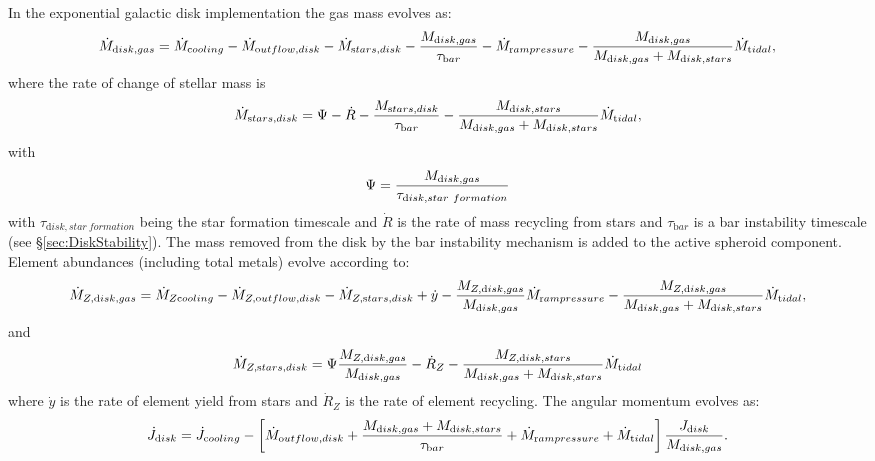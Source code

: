 In the exponential galactic disk implementation the gas mass evolves as:
\begin{equation}
 \dot{M}_{\mathrm disk, gas} = \dot{M}_{\mathrm cooling} - \dot{M}_{\mathrm outflow, disk} - \dot{M}_{\mathrm stars, disk} - {M_{\mathrm disk, gas}\over \tau_{\mathrm bar}} - \dot{M}_{\mathrm ram pressure} - {M_{\mathrm disk, gas} \over M_{\mathrm disk, gas} + M_{\mathrm disk, stars}} \dot{M}_{\mathrm tidal},
\end{equation}
where the rate of change of stellar mass is
\begin{equation}
 \dot{M}_{\mathrm stars, disk} = \Psi - \dot{R} - {M_{\mathrm stars,disk} \over \tau_{\mathrm bar}} - {M_{\mathrm disk, stars} \over M_{\mathrm disk, gas} + M_{\mathrm disk, stars}} \dot{M}_{\mathrm tidal},
\end{equation}
with
\begin{equation}
 \Psi = {M_{\mathrm disk, gas} \over \tau_{\mathrm disk, star~formation}}
\end{equation}
with $\tau_{\mathrm disk, star~formation}$ being the star formation timescale and $\dot{R}$ is the rate of mass recycling from stars and $\tau_{\mathrm bar}$ is a bar instability timescale (see \S\ref{sec:DiskStability}). The mass removed from the disk by the bar instability mechanism is added to the active spheroid component.
Element abundances (including total metals) evolve according to:
\begin{equation}
  \dot{M}_{Z, {\mathrm disk, gas}} = \dot{M}_{Z {\mathrm cooling}} - \dot{M}_{Z, {\mathrm outflow, disk}} - \dot{M}_{Z, {\mathrm stars, disk}} + \dot{y} - {M_{Z, {\mathrm disk, gas}} \over M_{\mathrm disk, gas}} \dot{M}_{\mathrm ram pressure} - {M_{Z, {\mathrm disk, gas}} \over M_{\mathrm disk, gas} + M_{\mathrm disk, stars}} \dot{M}_{\mathrm tidal},
\end{equation}
and
\begin{equation}
 \dot{M}_{Z, {\mathrm stars, disk}} = \Psi {M_{Z, {\mathrm disk, gas}} \over M_{\mathrm disk, gas}} - \dot{R}_Z - {M_{Z, {\mathrm disk, stars}} \over M_{\mathrm disk, gas} + M_{\mathrm disk, stars}} \dot{M}_{\mathrm tidal}
\end{equation}
where $\dot{y}$ is the rate of element yield from stars and $\dot{R}_Z$ is the rate of element recycling. The angular momentum evolves as:
\begin{equation}
 \dot{J}_{\mathrm disk} = \dot{J}_{\mathrm cooling} - \left[ \dot{M}_{\mathrm outflow, disk} + {M_{\mathrm disk, gas}  + M_{\mathrm disk, stars} \over \tau_{\mathrm bar}} + \dot{M}_{\mathrm ram pressure} + \dot{M}_{\mathrm tidal}\right] {J_{\mathrm disk} \over M_{\mathrm disk, gas}}.
\end{equation}

